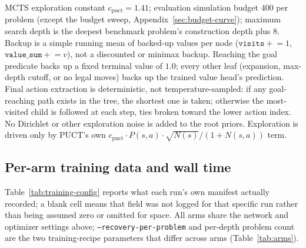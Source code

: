 \documentclass[11pt]{article}
\numberwithin{equation}{section}
\begin{document}
MCTS exploration constant $c_{\text{puct}}=1.41$; evaluation simulation budget 400 per problem (except the budget sweep, Appendix~\ref{sec:budget-curve}); maximum search depth is the deepest benchmark problem's construction depth plus 8. Backup is a simple running mean of backed-up values per node ($\texttt{visits} \mathrel{+}= 1$, $\texttt{value\_sum} \mathrel{+}= v$), not a discounted or minimax backup. Reaching the goal predicate backs up a fixed terminal value of $1.0$; every other leaf (expansion, max-depth cutoff, or no legal moves) backs up the trained value head's prediction. Final action extraction is deterministic, not temperature-sampled: if any goal-reaching path exists in the tree, the shortest one is taken; otherwise the most-visited child is followed at each step, ties broken toward the lower action index. No Dirichlet or other exploration noise is added to the root priors. Exploration is driven only by PUCT's own $c_{\text{puct}} \cdot P(s,a) \cdot \sqrt{N(s)}/(1+N(s,a))$ term.

\subsection{Per-arm training data and wall time}
Table~\ref{tab:training-config} reports what each run's own manifest actually recorded; a blank cell means that field was not logged for that specific run rather than being assumed zero or omitted for space. All arms share the network and optimizer settings above; \texttt{--recovery-per-problem} and per-depth problem count are the two training-recipe parameters that differ across arms (Table~\ref{tab:arms}).

\begin{table}[h]
\centering
\scriptsize
{}
\caption{Per-arm training statistics, taken directly from each run's own saved manifest. v1's epoch count is inferred from its best-epoch report (epoch 12, zero-indexed) rather than separately logged; v2's total epoch count was not captured in its manifest. Ablation wall times vary slightly by seed at fixed epoch count due to normal machine-load variation, not a configuration difference.}
\label{tab:training-config}
\end{table}
\end{document}
